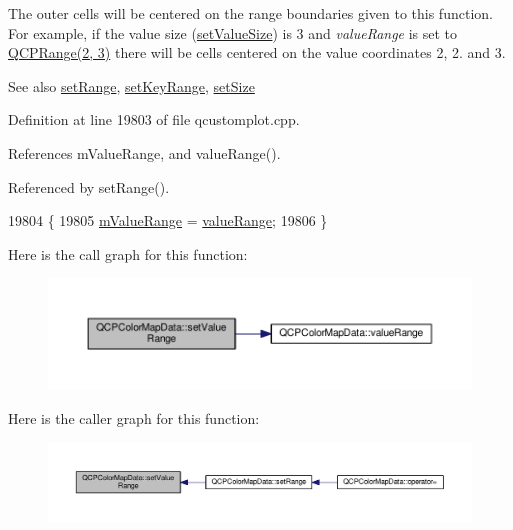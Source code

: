 The outer cells will be centered on the range boundaries given to this function. For example, if the value size (\hyperlink{class_q_c_p_color_map_data_a0893c9e3914513048b45e3429ffd16f2}{set\+Value\+Size}) is 3 and {\itshape value\+Range} is set to {\ttfamily \hyperlink{class_q_c_p_range}{Q\+C\+P\+Range(2, 3)}} there will be cells centered on the value coordinates 2, 2. and 3.

\begin{DoxySeeAlso}{See also}
\hyperlink{class_q_c_p_color_map_data_aad9c1c7c703c1339489fc730517c83d4}{set\+Range}, \hyperlink{class_q_c_p_color_map_data_a0738c485f3c9df9ea1241b7a8bb6a86e}{set\+Key\+Range}, \hyperlink{class_q_c_p_color_map_data_a0d9ff35c299d0478b682bfbcdd9c097e}{set\+Size} 
\end{DoxySeeAlso}


Definition at line 19803 of file qcustomplot.\+cpp.



References m\+Value\+Range, and value\+Range().



Referenced by set\+Range().


\begin{DoxyCode}
19804 \{
19805   \hyperlink{class_q_c_p_color_map_data_a225bb96f10c1a27b51ae59249477dbef}{mValueRange} = \hyperlink{class_q_c_p_color_map_data_a025be4d7ba0494fd7b38a5a56c737f2a}{valueRange};
19806 \}
\end{DoxyCode}


Here is the call graph for this function\+:\nopagebreak
\begin{figure}[H]
\begin{center}
\leavevmode
\includegraphics[width=350pt]{class_q_c_p_color_map_data_ada1b2680ba96a5f4175b6d341cf75d23_cgraph}
\end{center}
\end{figure}




Here is the caller graph for this function\+:\nopagebreak
\begin{figure}[H]
\begin{center}
\leavevmode
\includegraphics[width=350pt]{class_q_c_p_color_map_data_ada1b2680ba96a5f4175b6d341cf75d23_icgraph}
\end{center}
\end{figure}


